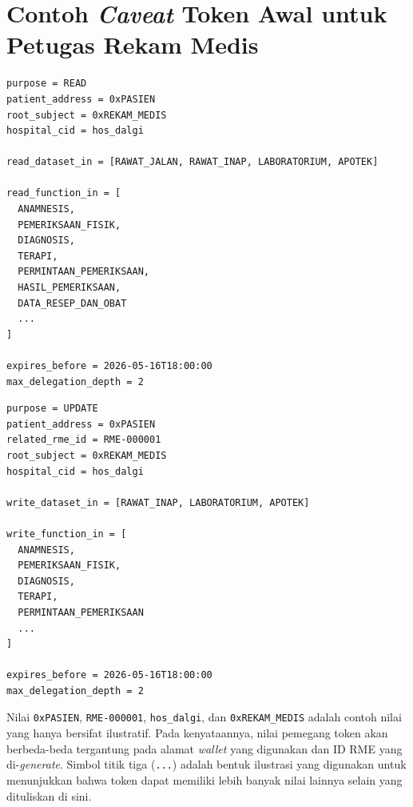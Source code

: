 \chapter{Contoh \textit{Caveat} Token Awal untuk Petugas Rekam Medis}
\label{lampiran:contoh-caveat-token-awal-rekam-medis}

\begin{lstlisting}[caption={Contoh Caveat Token \texttt{READ} Awal untuk Petugas Rekam Medis}, label={lst:contoh-token-baca-awal-rekam-medis}]
purpose = READ
patient_address = 0xPASIEN
root_subject = 0xREKAM_MEDIS
hospital_cid = hos_dalgi

read_dataset_in = [RAWAT_JALAN, RAWAT_INAP, LABORATORIUM, APOTEK]

read_function_in = [
  ANAMNESIS,
  PEMERIKSAAN_FISIK,
  DIAGNOSIS,
  TERAPI,
  PERMINTAAN_PEMERIKSAAN,
  HASIL_PEMERIKSAAN,
  DATA_RESEP_DAN_OBAT
  ...
]

expires_before = 2026-05-16T18:00:00
max_delegation_depth = 2
\end{lstlisting}

\begin{lstlisting}[caption={Contoh Caveat Token \texttt{UPDATE} Awal untuk Petugas Rekam Medis}, label={lst:contoh-token-pembaruan-awal-rekam-medis}]
purpose = UPDATE
patient_address = 0xPASIEN
related_rme_id = RME-000001
root_subject = 0xREKAM_MEDIS
hospital_cid = hos_dalgi

write_dataset_in = [RAWAT_INAP, LABORATORIUM, APOTEK]

write_function_in = [
  ANAMNESIS,
  PEMERIKSAAN_FISIK,
  DIAGNOSIS,
  TERAPI,
  PERMINTAAN_PEMERIKSAAN
  ...
]

expires_before = 2026-05-16T18:00:00
max_delegation_depth = 2
\end{lstlisting}

Nilai \texttt{0xPASIEN}, \texttt{RME-000001}, \texttt{hos\_dalgi}, dan \texttt{0xREKAM\_MEDIS} adalah contoh nilai yang hanya bersifat ilustratif. Pada kenyataannya, nilai pemegang token akan berbeda-beda tergantung pada alamat \textit{wallet} yang digunakan dan ID RME yang di-\textit{generate}. Simbol titik tiga (\texttt{...}) adalah bentuk ilustrasi yang digunakan untuk menunjukkan bahwa token dapat memiliki lebih banyak nilai lainnya selain yang dituliskan di sini.
